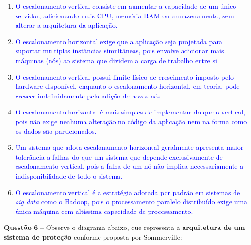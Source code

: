 \documentclass[12pt,a4paper]{article}
\begin{document}
\vspace{0.3cm}

\begin{enumerate}[label=\textbf{(\hspace{0.6cm})} ,leftmargin=2cm]

    \item[\textcolor{blue}{\textbf{( V )}}] \textcolor{blue}{O escalonamento vertical consiste em aumentar a capacidade de um único servidor, adicionando mais CPU, memória RAM ou armazenamento, sem alterar a arquitetura da aplicação.}

    \item[\textcolor{blue}{\textbf{( V )}}] \textcolor{blue}{O escalonamento horizontal exige que a aplicação seja projetada para suportar múltiplas instâncias simultâneas, pois envolve adicionar mais máquinas (nós) ao sistema que dividem a carga de trabalho entre si.}

    \item[\textcolor{blue}{\textbf{( V )}}] \textcolor{blue}{O escalonamento vertical possui limite físico de crescimento imposto pelo hardware disponível, enquanto o escalonamento horizontal, em teoria, pode crescer indefinidamente pela adição de novos nós.}

    \item[\textcolor{blue}{\textbf{( F )}}] \textcolor{blue}{O escalonamento horizontal é mais simples de implementar do que o vertical, pois não exige nenhuma alteração no código da aplicação nem na forma como os dados são particionados.}

    \item[\textcolor{blue}{\textbf{( V )}}] \textcolor{blue}{Um sistema que adota escalonamento horizontal geralmente apresenta maior tolerância a falhas do que um sistema que depende exclusivamente de escalonamento vertical, pois a falha de um nó não implica necessariamente a indisponibilidade de todo o sistema.}

    \item[\textcolor{blue}{\textbf{( F )}}] \textcolor{blue}{O escalonamento vertical é a estratégia adotada por padrão em sistemas de \textit{big data} como o Hadoop, pois o processamento paralelo distribuído exige uma única máquina com altíssima capacidade de processamento.}

\end{enumerate}

\vspace{0.5cm}

\textbf{Questão 6} -- Observe o diagrama abaixo, que representa a \textbf{arquitetura de um sistema de proteção} conforme proposta por Sommerville:
\end{document}

